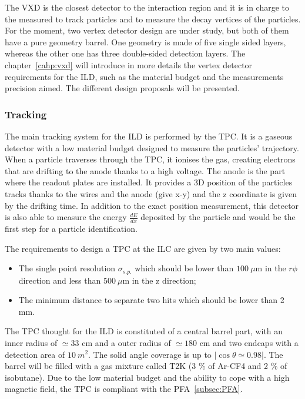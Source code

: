       The \gls{VXD} is the closest detector to the interaction region and it is in charge to the measured to track particles and to measure the decay vertices of the particles.
      For the moment, two vertex detector design are under study, but both of them have a pure geometry barrel.
      One geometry is made of five single sided layers, whereas the other one has three double-sided detection layers.
      The chapter~\ref{cahp:vxd} will introduce in more details the vertex detector requirements for the \gls{ILD}, such as the material budget and the measurements precision aimed.
      The different design proposals will be presented. 

      \subsubsection{Tracking}

      The main tracking system for the \gls{ILD} is performed by the \gls{TPC}.
      It is a gaseous detector with a low material budget designed to measure the particles' trajectory.
      When a particle traverses through the \gls{TPC}, it ionises the gas, creating electrons that are drifting to the anode thanks to a high voltage.
      The anode is the part where the readout plates are installed.
      It provides a 3D position of the particles tracks thanks to the wires and the anode (give x-y) and the z coordinate is given by the drifting time.
      In addition to the exact position measurement, this detector is also able to measure the energy $\frac{dE}{dx}$ deposited by the particle and would be the first step for a particle identification.

      The requirements to design a \gls{TPC} at the \gls{ILC} are given by two main values: 
      
      \begin{itemize} 
        \item The single point resolution $\sigma_{s.p.}$ which should be lower than $100 \ \mu\text{m}$ in the $r\phi$ direction and less than $500 \ \mu\text{m}$ in the z direction;
        \item The minimum distance to separate two hits which should be lower than 2 mm.
      \end{itemize}

      The \gls{TPC} thought for the \gls{ILD} is constituted of a central barrel part, with an inner radius of $\simeq 33 \text{ cm}$ and a outer radius of $\simeq 180 \text{ cm}$ and two endcaps with a detection area of $10 \ m^2$. 
      The solid angle coverage is up to $|\cos{\theta} \simeq 0.98|$.
      The barrel will be filled with a gas mixture called T2K (3 \% of Ar-CF4 and 2 \% of isobutane).
      Due to the low material budget and the ability to cope with a high magnetic field, the \gls{TPC} is compliant with the \gls{PFA}~\ref{subsec:PFA}. 


